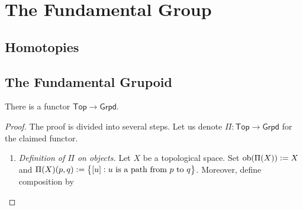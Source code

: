 \chapter{The Fundamental Group}
\section{Homotopies}

\section{The Fundamental Grupoid}

\begin{theorem}
	There is a functor $\mathsf{Top} \to \mathsf{Grpd}$. 
\end{theorem}

\begin{proof}
	The proof is divided into several steps. Let us denote $\Pi : \mathsf{Top} \to \mathsf{Grpd}$ for the claimed functor.
	\begin{enumerate}[label = \textit{Step \arabic*:},wide = 0pt, itemsep = 1.5ex]
		\item \textit{Definition of $\Pi$ on objects.} Let $X$ be a topological space. Set $\operatorname{ob}(\Pi(X)) := X$ and $\Pi(X)(p,q) := \cbr{\sbr{u} : u \text{ is a path from } p \text{ to } q}$. Moreover, define composition by 
	\end{enumerate}
\end{proof}
